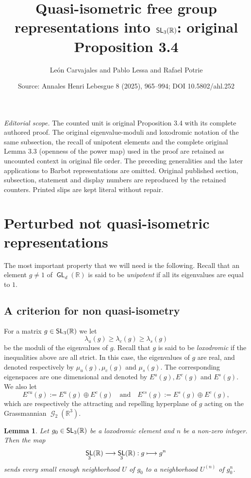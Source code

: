 \documentclass[10pt,a4paper]{amsart}
\title[A criterion for non-robust quasi-isometry]{Quasi-isometric free group representations into $\SL_3(\R)$: original Proposition 3.4}
\author{Le\'on Carvajales and Pablo Lessa and Rafael Potrie}
\date{Source: Annales Henri Lebesgue 8 (2025), 965--994; DOI 10.5802/ahl.252}
\DeclareMathOperator{\SL}{\mathsf{SL}}
\DeclareMathOperator{\Gr}{\mathcal{G}}
\DeclareMathOperator{\GL}{\mathsf{GL}}
\newcommand{\R}{\mathbb{R}}
\newcommand{\RR}{\R}
\newcommand{\Es}{E^s}
\newcommand{\Ec}{E^c}
\newcommand{\Eu}{E^u}
\newcommand{\Ecs}{E^{cs}}
\newcommand{\Ecu}{E^{cu}}
\renewcommand*{\to}{\mathchoice{\longrightarrow}{\rightarrow}{\rightarrow}{\rightarrow}}
\let\oldmapsto\mapsto
\renewcommand*{\mapsto}{\mathchoice{\longmapsto}{\oldmapsto}{\oldmapsto}{\oldmapsto}}
\let\oldin\in
\renewcommand{\in}{\mathchoice{\oldin}{\oldin}{\,\oldin\,}{\,\oldin\,}}
\numberwithin{equation}{section}
\newtheorem{lemm}[theo]{Lemma}
\theoremstyle{definition}\newtheorem{defi}[theo]{Definition}
\begin{document}
\maketitle
\noindent\textit{Editorial scope.} The counted unit is original Proposition 3.4 with its complete authored proof. The original eigenvalue-moduli and loxodromic notation of the same subsection, the recall of unipotent elements and the complete original Lemma 3.3 (openness of the power map) used in the proof are retained as uncounted context in original file order. The preceding generalities and the later applications to Barbot representations are omitted. Original published section, subsection, statement and display numbers are reproduced by the retained counters. Printed slips are kept literal without repair.
\setcounter{section}{2}
\section{Perturbed not quasi-isometric representations}\label{sec: generalities QI}

The most important property that we will need is the following. Recall that an element $g\neq 1$ of $\GL_d(\R)$ is said to be \emph{unipotent} if all its eigenvalues are equal to $1$.

\setcounter{subsection}{1}
\subsection{A criterion for non quasi-isometry}\label{ss.criterionnonQI}

For a matrix $g\in\SL_3(\R)$ we let
\[
\lambda_u(g)\geq\lambda_c(g)\geq\lambda_s(g)
\]
be the moduli of
the eigenvalues of $g$. Recall that $g$ is said to be \emph{loxodromic} if the inequalities above are all strict. In this case, the eigenvalues of $g$ are real, and denoted respectively by $\mu_u(g),\mu_c(g)$ and $\mu_s(g)$. The corresponding eigenspaces are one dimensional and denoted by $\Eu(g),\Ec(g)$
and $\Es(g)$. We also let
\[
\Ecu(g):=\Eu(g)\oplus\Ec(g) \quad\text{and}\quad
\Ecs(g):=\Es(g)\oplus\Ec(g),
\]
which are respectively the
attracting and repelling hyperplane of $g$ acting on the Grassmannian $\Gr_2(\R^3)$.

\setcounter{theo}{2}
\begin{lemm}\label{lem: power map is open}
Let $g_0\in\SL_3(\RR)$ be a loxodromic element and $n$ be a non-zero integer.
Then the map
\[
\SL_3(\RR)\to \SL_3(\RR): g\mapsto g^n
\]
sends every small enough neighborhood $U$ of $g_0$ to a neighborhood $U^{(n)}$ of $g_0^n$.
\end{lemm}
\end{document}
